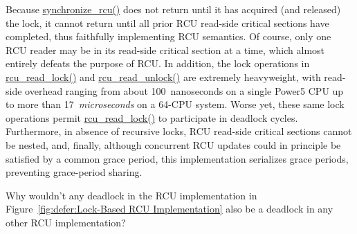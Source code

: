 Because \url{synchronize_rcu()} does not return until it has acquired
(and released) the lock, it cannot return until all prior RCU read-side
critical sections have completed, thus faithfully implementing
RCU semantics.
Of course, only one RCU reader may be in its read-side critical section
at a time, which almost entirely defeats the purpose of RCU.
In addition, the lock operations in \url{rcu_read_lock()} and
\url{rcu_read_unlock()} are extremely heavyweight,
with read-side overhead ranging from about 100~nanoseconds on a single Power5
CPU up to more than 17~\emph{microseconds} on a 64-CPU system.
Worse yet,
these same lock operations permit \url{rcu_read_lock()}
to participate in deadlock cycles.
Furthermore, in absence of recursive locks, 
RCU read-side critical sections cannot be nested, and, finally,
although concurrent RCU updates could in principle be satisfied by
a common grace period, this implementation serializes grace periods,
preventing grace-period sharing.

\QuickQuiz{}
	Why wouldn't any deadlock in the RCU implementation in
	Figure~\ref{fig:defer:Lock-Based RCU Implementation}
	also be a deadlock in any other RCU implementation?
 \QuickQuizEnd

